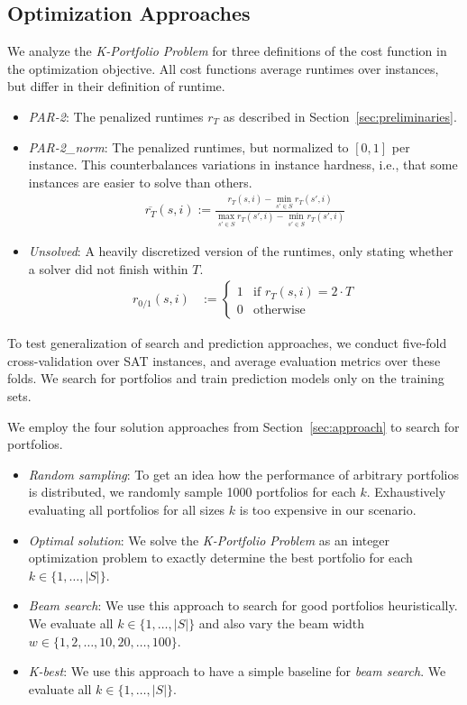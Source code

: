 \documentclass[conference]{IEEEtran}
\begin{document}
\subsection{Optimization Approaches}

We analyze the \emph{K-Portfolio Problem} for three definitions of the cost function in the optimization objective.
All cost functions average runtimes over instances, but differ in their definition of runtime.

\begin{itemize}
	\item \emph{PAR-2}: The penalized runtimes $r_T$ as described in Section~\ref{sec:preliminaries}.
	\item \emph{PAR-2\_norm}: The penalized runtimes, but normalized to $[0,1]$ per instance. This counterbalances variations in instance hardness, i.e., that some instances are easier to solve than others.
	\begin{align*}
		\overline{r_T}(s,i) := \frac{r_T(s,i) - \min\limits_{s' \in S}{r_T(s',i)}}{\max\limits_{s' \in S}{r_T(s',i)} - \min\limits_{s' \in S}{r_T(s',i)}}
	\end{align*}
	\item \emph{Unsolved}: A heavily discretized version of the runtimes, only stating whether a solver did not finish within $T$.
	\begin{align*}
		r_{0/1}(s,i) &:= \begin{cases}
			1 & \text{if }r_T(s,i) = 2 \cdot T\\
			0 & \text{otherwise}
		\end{cases}
	\end{align*}
\end{itemize}

To test generalization of search and prediction approaches, we conduct five-fold cross-validation over SAT instances, and average evaluation metrics over these folds. 
We search for portfolios and train prediction models only on the training sets.

We employ the four solution approaches from Section~\ref{sec:approach} to search for portfolios.

\begin{itemize}
	\item \emph{Random sampling}:
	To get an idea how the performance of arbitrary portfolios is distributed, we randomly sample 1000 portfolios for each $k$.
	Exhaustively evaluating all portfolios for all sizes $k$ is too expensive in our scenario.
	\item \emph{Optimal solution}:
	We solve the \emph{K-Portfolio Problem} as an integer optimization problem to exactly determine the best portfolio for each $k \in \{1, \dots, |S|\}$.
	\item \emph{Beam search}: 
	We use this approach to search for good portfolios heuristically.
	We evaluate all $k \in \{1, \dots, |S|\}$ and also vary the beam width $w \in \{1, 2, \dots, 10, 20, \dots, 100\}$.
	\item \emph{K-best}:
	We use this approach to have a simple baseline for \emph{beam search}.
	We evaluate all $k \in \{1, \dots, |S|\}$.
\end{itemize}
\end{document}
